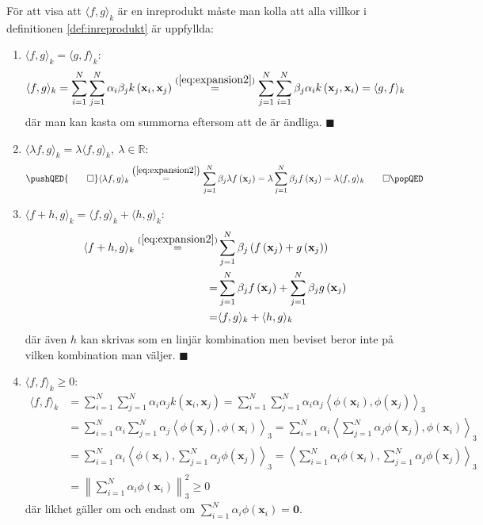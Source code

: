 \documentclass[a4paper, 12pt]{report}
\theoremstyle{definition}
\theoremstyle{remark}
\renewcommand\qedsymbol{$\blacksquare$}
\newcommand{\bfx}{\mathbf{x}}
\begin{document}
För att visa att $\langle f, g \rangle_k$ är en inreprodukt måste man kolla att alla villkor i definitionen \ref{def:inreprodukt} är uppfyllda:
\begin{enumerate}
	\item $\langle f, g \rangle_k=\langle g, f \rangle_k$:
	\begin{align*}
		\langle f, g \rangle_k = \sum_{i=1}^{N} \sum_{j=1}^{N} \alpha_i \beta_j k\left(\bfx_i, \bfx_j\right) \overset{(\ref{eq:expansion2})}{=} \sum_{j=1}^{N} \sum_{i=1}^{N}  \beta_j \alpha_i k\left(\bfx_j, \bfx_i\right) = \langle g, f \rangle_k
	\end{align*}
	där man kan kasta om summorna eftersom att de är ändliga. \hfill \qedsymbol
	\item $\langle \lambda f, g \rangle_k=\lambda\langle f, g \rangle_k,~\lambda\in\mathbb{R}$:
	\begin{equation*}
	\pushQED{\qed}
		\langle \lambda f, g \rangle_k	\overset{\left(\ref{eq:expansion2}\right)}{=} \sum_{j=1}^{N} \beta_j \lambda f\left(\bfx_j\right) = \lambda \sum_{j=1}^{N} \beta_j f\left(\bfx_j\right) = \lambda\langle f, g \rangle_k \qedhere
		\popQED
	\end{equation*}
	\item $\langle f+h, g\rangle_k = \langle f, g\rangle_k + \langle h, g\rangle_k$:
	\begin{align*}
		\langle f+h, g \rangle_k \overset{(\ref{eq:expansion2})}{=} &\sum_{j=1}^{N} \beta_j \left(f\left(\bfx_j\right) + g\left(\bfx_j\right)\right)\\
		= &\sum_{j=1}^{N} \beta_j f\left(\bfx_j\right) + \sum_{j=1}^{N} \beta_j g\left(\bfx_j\right)\\
		= &\langle f, g\rangle_k + \langle h, g\rangle_k
	\end{align*}
	där även $h$ kan skrivas som en linjär kombination men beviset beror inte på vilken kombination man väljer. \hfill \qedsymbol
	\item $\langle f, f \rangle_k\geq0$:
	\begin{align*}
	\langle f, f \rangle_k &= \sum_{i=1}^{N}\sum_{j=1}^{N}\alpha_i\alpha_jk\left(\bfx_i,\bfx_j\right)
	= \sum_{i=1}^{N}\sum_{j=1}^{N}\alpha_i\alpha_j\left\langle\phi\left(\bfx_i\right),\phi\left(\bfx_j\right)\right\rangle_3\\
	&= \sum_{i=1}^{N}\alpha_i\sum_{j=1}^{N}\alpha_j\left\langle\phi\left(\bfx_j\right),\phi\left(\bfx_i\right)\right\rangle_3
	= \sum_{i=1}^{N}\alpha_i\left\langle\sum_{j=1}^{N}\alpha_j\phi\left(\bfx_j\right),\phi\left(\bfx_i\right)\right\rangle_3\\
	&= \sum_{i=1}^{N}\alpha_i\left\langle\phi\left(\bfx_i\right),\sum_{j=1}^{N}\alpha_j\phi\left(\bfx_j\right)\right\rangle_3
	= \left\langle\sum_{i=1}^{N}\alpha_i\phi\left(\bfx_i\right),\sum_{j=1}^{N}\alpha_j\phi\left(\bfx_j\right)\right\rangle_3\\
	&= \left\|\sum_{i=1}^{N}\alpha_i\phi\left(\bfx_i\right)\right\|_3^2\geq 0
	\end{align*}
	där likhet gäller om och endast om $\sum_{i=1}^{N}\alpha_i\phi\left(\bfx_i\right)=\mathbf{0}$.
	

\end{enumerate}
\end{document}

